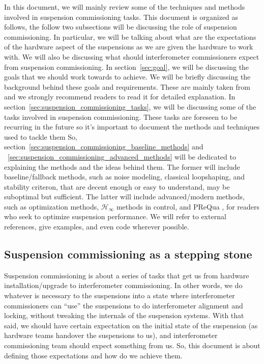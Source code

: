 In this document, we will mainly review some of the techniques and methods involved in suspension commissioning tasks.
This document is organized as follows, the follow two subsections will be discussing the role of suspension commissioning.
In particular, we will be talking about what are the expectations of the hardware aspect of the suspensions as we are given the hardware to work with.
We will also be discussing what should interferometer commissioners expect from suspension commissioning.
In section~\ref{sec:goal}, we will be discussing the goals that we should work towards to achieve. We will be briefly discussing the background behind these goals and requirements.
These are mainly taken from \cite{Sekiguchi:2016bmv} and we strongly recommend readers to read it for detailed explanation.
In section~\ref{sec:suspension_commissioning_tasks}, we will be discussing some of the tasks involved in suspension commissioning.
These tasks are foreseen to be recurring in the future so it's important to document the methods and techniques used to tackle them
So, section~\ref{sec:suspension_commissioning_baseline_methods} and ~\ref{sec:suspension_commissioning_advanced_methods} will be dedicated to explaining the methods and the ideas behind them.
The former will include baseline/fallback methods, such as noise modeling, classical loopshaping, and stability criteron, that are decent enough or easy to understand, may be suboptimal but sufficient.
The latter will include advanced/modern methods, such as optimization methods, $\mathcal{H}_\infty$ methods in control,  and PReQua \cite{prequa}, for readers who seek to optimize suspension performance.
We will refer to external references, give examples, and even code wherever possible.


\subsection{Suspension commissioning as a stepping stone}
Suspension commissioning is about a series of tasks that get us from hardware installation/upgrade to interferometer commissioning.
In other words, we do whatever is necessary to the suspensions into a state where interferometer commissioners can ``use'' the suspensions to do interferometer alignment and locking, without tweaking the internals of the suspension systems.
With that said, we should have certain expectation on the initial state of the suspension (as hardware teams handover the suspensions to us), and interferometer commissioning team should expect something from us.
So, this document is about defining those expectations and how do we achieve them.


